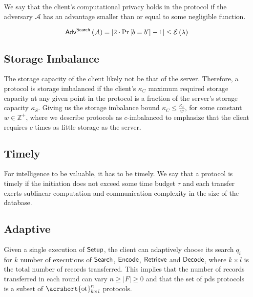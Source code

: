 \hfill

We say that the client's computational privacy holds in the protocol if the adversary $ \mathcal{A} $ has an advantage smaller than or equal to some negligible function.

\begin{equation*}
    \mathsf{{Adv}}^{\mathsf{{Search}}} \left( \mathcal{A} \right) = \left| 2 \cdot \Pr \left[ b = b' \right] - 1 \right| \leq \mathcal{E} \left( \lambda \right)
\end{equation*}

\subsection*{\thesubsection\quad Storage Imbalance}\label{subsec:StorageImbalanace}

The storage capacity of the client likely not be that of the server. Therefore, a protocol is storage imbalanced if the client's $ \kappa_C $ maximum required storage capacity at any given point in the protocol is a fraction of the server's storage capacity $ \kappa_S $. Giving us the storage imbalance bound $ \kappa_C \leq \frac{\kappa_S}{w} $, for some constant $ w \in \mathbb{Z}^+ $, where we describe protocols as $ c $-imbalanced to emphasize that the client requires $ c $ times as little storage as the server.

\subsection*{\thesubsection\quad Timely}\label{subsec:Timely}

For intelligence to be valuable, it has to be timely. We say that a protocol is timely if the initiation does not exceed some time budget $ \tau $ and each transfer exerts sublinear computation and communication complexity in the size of the database. 


\subsection*{\thesubsection\quad Adaptive}\label{subsec:Adaptive}

\newcommand{\OT}{\text{\acrshort{ot}}}
Given a single execution of $ \mathsf{{Setup}} $, the client can adaptively choose its search $ q_i $ for $ k $ number of executions of $ \mathsf{{Search}} $, $ \mathsf{{Encode}} $, $ \mathsf{{Retrieve}} $ and $ \mathsf{{Decode}} $, where $ k \times l $ is the total number of records transferred. This implies that the number of records transferred in each round can vary $ n \geq \vert F \vert \geq 0 $ and that the set of \acrshort{pds} protocols is a subset of $ \OT^{n}_{k \times l} $ protocols.


